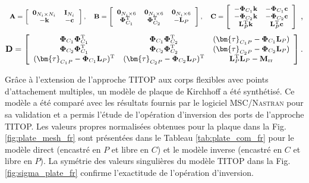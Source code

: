 \begin{equation*}
\begin{footnotesize}
\begin{array}{lll}
	\mathbf{A} = \left[\begin{array}{cc}
\mathbf{0}_{N_i\times N_i} & \mathbf{I}_{N_i} \\
-\mathbf{k} & -\mathbf{c}
\end{array}\right], 
	& \mathbf{B} =  \left[\begin{array}{ccc}
	\mathbf{0}_{N_i\times 6} & \mathbf{0}_{N_i\times 6} & \mathbf{0}_{N_i\times 6} \\
	\mathbf{\Phi}_{C_1}^{\mathrm{T}} & \mathbf{\Phi}_{C_2}^{\mathrm{T}} & -\mathbf{L}_{P}
	\end{array}\right], &
	\mathbf{C} = \left[\begin{array}{cc}
		-\mathbf{\Phi}_{C_1}\mathbf{k} & -\mathbf{\Phi}_{C_1}\mathbf{c} \\
		-\mathbf{\Phi}_{C_2}\mathbf{k} & -\mathbf{\Phi}_{C_2}\mathbf{c}  \\
		\mathbf{L}_{P}^{\mathrm{T}}\mathbf{k} & \mathbf{L}_{P}^{\mathrm{T}}\mathbf{c}
	\end{array}\right]
\end{array},
\end{footnotesize}
\end{equation*}
\begin{equation}
\begin{small}
		\mathbf{D} = \left[\begin{array}{ccc}
		\mathbf{\Phi}_{C_1}\mathbf{\Phi}_{C_1}^{\mathrm{T}} & \mathbf{\Phi}_{C_1}\mathbf{\Phi}_{C_2}^{\mathrm{T}} & (\bm{\tau}_{C_1P}-\mathbf{\Phi}_{C_1}\mathbf{L}_{P}) \\
		\mathbf{\Phi}_{C_2}\mathbf{\Phi}_{C_1}^{\mathrm{T}} & \mathbf{\Phi}_{C_2}\mathbf{\Phi}_{C_2}^{\mathrm{T}} & (\bm{\tau}_{C_2P}-\mathbf{\Phi}_{C_2}\mathbf{L}_{P}) \\
		(\bm{\tau}_{C_1P}-\mathbf{\Phi}_{C_1}\mathbf{L}_{P})^{\mathrm{T}} & (\bm{\tau}_{C_2P}-\mathbf{\Phi}_{C_2}\mathbf{L}_{P})^{\mathrm{T}} & \mathbf{L}_{P}^{\mathrm{T}}\mathbf{L}_{P} - \mathbf{M}_{\mathrm{rr}}
\end{array}\right].
\end{small}
\end{equation}

Gr\^ace \`a l'extension de l'approche TITOP aux corps flexibles avec points d'attachement multiples, un mod\`ele de plaque de Kirchhoff a \'et\'e synth\'etis\'e. Ce mod\`ele a \'et\'e compar\'e avec les r\'esultats fournis par le logiciel MSC/\textsc{Nastran} pour sa validation et a permis l'\'etude de l'op\'eration d'inversion des ports de l'approche TITOP. Les valeurs propres normalis\'ees obtenues pour la plaque dans la Fig. \ref{fig:plate_mesh_fr} sont pr\'esent\'ees dans le Tableau \ref{tab:plate_com_fr} pour le mod\`ele direct (encastr\'e en $P$ et libre en $C$) et le mod\`ele inverse (encastr\'e en $C$ et libre en $P$). La sym\'etrie des valeurs singuli\`eres du mod\`ele TITOP dans la Fig. \ref{fig:sigma_plate_fr} confirme l'exactitude de l'op\'eration d'inversion.

